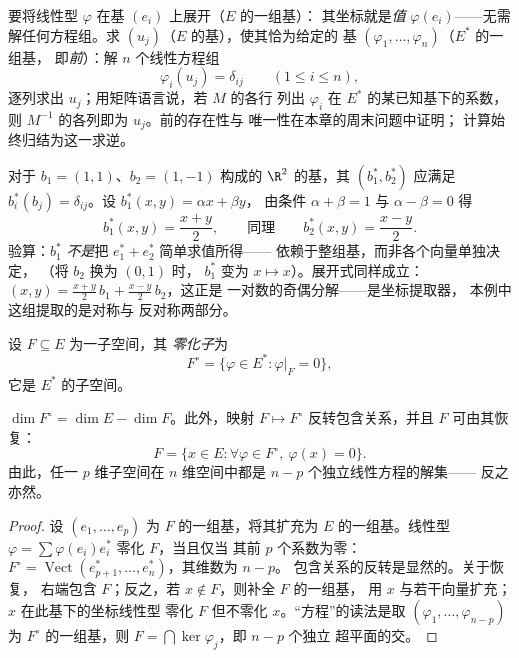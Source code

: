 \begin{method}[对偶基与前对偶基的实际应用]\label{met:b2:linalg:dualbasis}
要将线性型 $\varphi$ 在基 $(e_i)$ 上展开（$E$ 的一组基）：
其坐标就是\emph{值} $\varphi(e_i)$——无需
解任何方程组。求 $(u_j)$（$E$ 的基），使其恰为给定的
基 $(\varphi_1, \dots, \varphi_n)$（$E^*$ 的一组基，
即\emph{前}）：解 $n$ 个线性方程组
\[
\varphi_i(u_j) = \delta_{ij} \qquad (1 \leq i \leq n),
\]
逐列求出 $u_j$；用矩阵语言说，若 $M$ 的各行
列出 $\varphi_i$ 在 $E^*$ 的某已知基下的系数，则
$M^{-1}$ 的各列即为 $u_j$。前的存在性与
唯一性在本章的周末问题中证明；
计算始终归结为这一求逆。
\end{method}

\begin{example}\label{ex:b2:linalg:dualbasis2d}
对于 $b_1 = (1, 1)$、$b_2 = (1, -1)$ 构成的 $\R^2$ 的基，其
$(b_1^*, b_2^*)$ 应满足 $b_i^*(b_j) =
\delta_{ij}$。设 $b_1^*(x, y) = \alpha x + \beta y$，
由条件 $\alpha + \beta = 1$ 与 $\alpha - \beta = 0$ 得
\[
b_1^*(x, y) = \frac{x + y}{2},
\qquad\text{同理}\qquad
b_2^*(x, y) = \frac{x - y}{2} .
\]
验算：$b_1^*$ \emph{不是}把 $e_1^* + e_2^*$ 简单求值所得——
依赖于整组基，而非各个向量单独决定，
（将 $b_2$ 换为 $(0, 1)$ 时，
$b_1^*$ 变为 $x \mapsto x$）。展开式同样成立：
$(x, y) = \frac{x+y}2\,b_1 + \frac{x-y}2\,b_2$，这正是
一对数的奇偶分解——是坐标提取器，
本例中这组提取的是对称与
反对称两部分。
\end{example}

\begin{definition}[零化子]\label{def:b2:linalg:annihilator}
设 $F \subseteq E$ 为一子空间，其
\emph{零化子}为
\[
F^{\circ} = \{\varphi \in E^* : \varphi|_F = 0\},
\]
它是 $E^*$ 的子空间。
\end{definition}

\begin{theorem}[零化子的维数]\label{thm:b2:linalg:annihilator}
$\dim F^{\circ} = \dim E - \dim F$。此外，映射 $F \mapsto F^\circ$
反转包含关系，并且 $F$ 可由其恢复：
\[
F = \{x \in E : \forall\varphi \in F^\circ,\ \varphi(x) = 0\}.
\]
由此，任一 $p$ 维子空间在 $n$ 维空间中都是
$n - p$ 个独立线性方程的解集——
反之亦然。
\end{theorem}

\begin{proof}
设 $(e_1, \dots, e_p)$ 为 $F$ 的一组基，将其扩充为
$E$ 的一组基。线性型 $\varphi = \sum \varphi(e_i) e_i^*$ 零化 $F$，当且仅当
其前 $p$ 个系数为零：$F^\circ =
\operatorname{Vect}(e_{p+1}^*, \dots, e_n^*)$，其维数为 $n - p$。
包含关系的反转是显然的。关于恢复，
右端包含 $F$；反之，若 $x \notin F$，则补全 $F$ 的一组基，
用 $x$ 与若干向量扩充；$x$ 在此基下的坐标线性型
零化 $F$ 但不零化 $x$。“方程”的读法是取
$(\varphi_1, \dots, \varphi_{n-p})$ 为 $F^\circ$ 的一组基，则 $F =
\bigcap \ker\varphi_j$，即 $n - p$ 个独立
超平面的交。
\end{proof}

